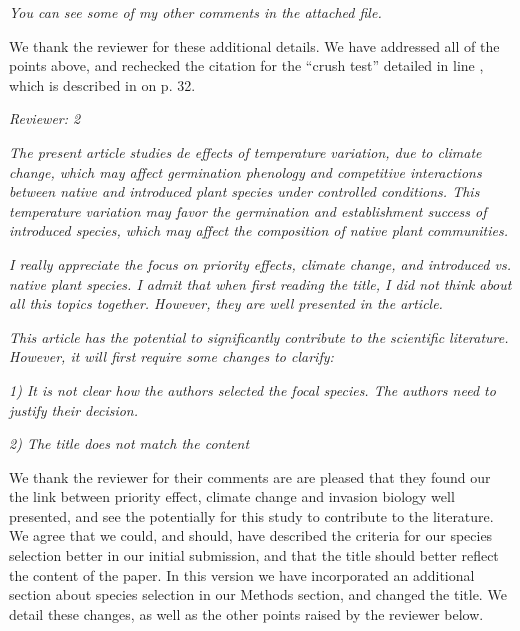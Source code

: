 \documentclass[11pt]{article}
\begin{document}



\emph{You can see some of my other comments in the attached file.}

We thank the reviewer for these additional details. We have addressed all of the points above, and rechecked the citation for the ``crush test'' detailed in line , which is described in \citet{Baskin2014} on p. 32. 

\emph{Reviewer: 2}

\emph{The present article studies de effects of temperature variation, due to climate change, which may affect germination phenology and competitive interactions between native and introduced plant species under controlled conditions. This temperature variation may favor the germination and establishment success of introduced species, which may affect the composition of native plant communities.}

\emph{I really appreciate the focus on priority effects, climate change, and introduced vs. native plant species. I admit that when first reading the title, I did not think about all this topics together. However, they are well presented in the article.}

\emph{This article has the potential to significantly contribute to the scientific literature. However, it will first require some changes to clarify:}

\emph{1) It is not clear how the authors selected the focal species. The authors need to justify their decision.}

\emph{2) The title does not match the content}

We thank the reviewer for their comments are are pleased that they found our the link between priority effect, climate change and invasion biology well presented, and see the potentially for this study to contribute to the literature. We agree that we could, and should, have described the criteria for our species selection better in our initial submission, and that the title should better reflect the content of the paper. In this version we have incorporated an additional section about species selection in our Methods section, and changed the title. We detail these changes, as well as the other points raised by the reviewer below.
\end{document}
